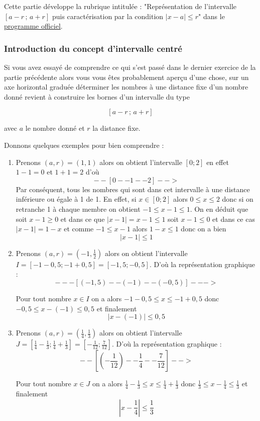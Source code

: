 \documentclass[a4paper, 11pt, twoside]{article}
\newcommand{\ceintr}[2]{\left[#1\,;\,#2\right]}
\newcommand{\disk}[3]{\left\lvert #1 - #2 \right\rvert \leq #3}
\begin{document}
Cette partie développe la rubrique intitulée : "Représentation de
l'intervalle \(\ceintr{a - r}{a + r}\) puis caractérisation par la
condition \(\disk{x}{a}{r}\)" dans le \href{https://eduscol.education.fr/document/24553/download}{programme officiel}.

\subsubsection{Introduction du concept d'intervalle centré}
\label{sec:org9b9ac86}

Si vous avez essayé de comprendre ce qui s'est passé dans le
dernier exercice de la partie précédente alors vous vous êtes
probablement aperçu d'une chose, sur un axe horizontal graduée
déterminer les nombres à une distance fixe d'un nombre donné
revient à construire les bornes d'un intervalle du type

\[\ceintr{a - r}{a + r}\]

avec \(a\) le nombre donné et \(r\) la distance fixe.

Donnons quelques exemples pour bien comprendre :

\begin{enumerate}
\item Prenons \((a, r) = (1,1)\) alors on obtient l'intervalle \([0 ; 2]\)
en effet \(1 - 1 = 0\) et \(1 + 1 = 2\) d'où \[--[0--1--2]-->\]
Par conséquent, tous les nombres qui sont dans cet intervalle à
une distance inférieure ou égale à 1 de 1. En effet, si \(x\in [0
      ; 2]\) alors \(0\leq x\leq 2\) donc si on retranche 1 à chaque
membre on obtient \(-1\leq x - 1\leq 1\). On en déduit que soit
\(x - 1 \geq 0\) et dans ce que \(\lvert x - 1\rvert = x - 1\leq 1\)
soit \(x - 1 \leq 0\) et dans ce cas \(\lvert x - 1\rvert = 1 - x\)
et comme \(-1\leq x - 1\) alors \(1 - x\leq 1\) donc on a bien
\[\disk{x}{1}{1}\]
\item Prenons \((a, r) = \left(-1,\frac{1}{2}\right)\) alors on obtient
l'intervalle \(I = [-1 - 0,5 ; -1 + 0,5] = [-1,5 ; -0,5]\). D'où la
représentation graphique :
\[---[(-1,5)--(-1)--(-0,5)]--->\]

Pour tout nombre \(x\in I\) on a alors \(-1 - 0,5 \leq x \leq -1 +
      0,5\) donc \(-0,5\leq x - (-1)\leq 0,5\) et finalement
\[\disk{x}{(-1)}{0,5}\]
\item Prenons \((a, r) = \left(\frac{1}{4},\frac{1}{3}\right)\) alors on obtient
l'intervalle \(J = \left[\frac{1}{4} - \frac{1}{3} ;
      \frac{1}{4} + \frac{1}{3}\right] = \left[-\frac{1}{12} ;
      \frac{7}{12}\right]\). D'où la représentation graphique :
\[--\left[\left(-\frac{1}{12}\right)--\frac{1}{4}--\frac{7}{12}\right]-->\]

Pour tout nombre \(x\in J\) on a alors \(\frac{1}{4} -
      \frac{1}{3} \leq x \leq \frac{1}{4} + \frac{1}{3}\) donc
\(\frac{1}{3}\leq x - \frac{1}{4}\leq \frac{1}{3}\) et
finalement \[\disk{x}{\frac{1}{4}}{\frac{1}{3}}\]
\end{enumerate}
\end{document}
